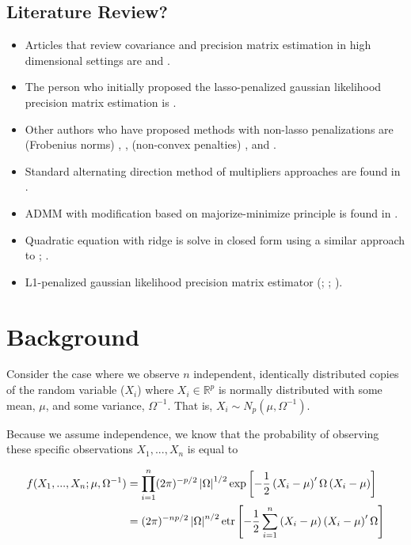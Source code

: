 \documentclass[11pt,]{report}
\begin{document}
\hypertarget{literature-review}{%
\subsection{Literature Review?}\label{literature-review}}

\begin{itemize}
\item
  Articles that review covariance and precision matrix estimation in high dimensional settings are \citet{pourahmadi2013high} and \citet{fan2016overview}.
\item
  The person who initially proposed the lasso-penalized gaussian likelihood precision matrix estimation is \citet{yuan2007model}.
\item
  Other authors who have proposed methods with non-lasso penalizations are (Frobenius norms) \citet{witten2009covariance}, \citet{rothman2014existence}, (non-convex penalties) \citet{lam2009sparsistency}, and \citet{fan2009network}.
\item
  Standard alternating direction method of multipliers approaches are found in \citet{boyd11distributed}.
\item
  ADMM with modification based on majorize-minimize principle is found in \citet{lange2016mm}.
\item
  Quadratic equation with ridge is solve in closed form using a similar approach to \citet{witten2009covariance}; \citet{price2015ridge}.
\item
  L1-penalized gaussian likelihood precision matrix estimator (\citet{yuan2007model}; \citet{rothman2008sparse}; \citet{friedman2008sparse}).
\end{itemize}

\hypertarget{background}{%
\section{Background}\label{background}}

Consider the case where we observe \(n\) independent, identically distributed copies of the random variable (\(X_{i}\)) where \(X_{i} \in \mathbb{R}^{p}\) is normally distributed with some mean, \(\mu\), and some variance, \(\Omega^{-1}\). That is, \(X_{i} \sim N_{p}\left( \mu, \Omega^{-1} \right)\).

Because we assume independence, we know that the probability of observing these specific observations \(X_{1}, ..., X_{n}\) is equal to

\begin{equation} 
\begin{split}
  f(X_{1}, ..., X_{n}; \mu, \Omega^{-1}) &= \prod_{i = 1}^{n}(2\pi)^{-p/2}\left| \Omega \right|^{1/2}\exp\left[ -\frac{1}{2}\left( X_{i} - \mu \right)'\Omega\left( X_{i} - \mu \right) \right] \\
  &= (2\pi)^{-np/2}\left| \Omega \right|^{n/2}\mbox{etr}\left[ -\frac{1}{2}\sum_{i = 1}^{n}\left( X_{i} - \mu \right)\left( X_{i} - \mu \right)'\Omega \right]
\end{split}
\label{eq:normallik}\notag
\end{equation}
\end{document}
